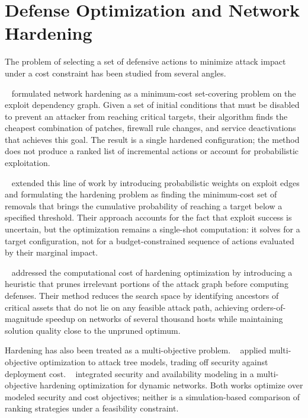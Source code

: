 \section{Defense Optimization and Network Hardening}

The problem of selecting a set of defensive actions to minimize attack impact under a cost constraint has been studied from several angles.

\citeauthor{noel03}~\cite{noel03} formulated network hardening as a minimum-cost set-covering problem on the exploit dependency graph. Given a set of initial conditions that must be disabled to prevent an attacker from reaching critical targets, their algorithm finds the cheapest combination of patches, firewall rule changes, and service deactivations that achieves this goal. The result is a single hardened configuration; the method does not produce a ranked list of incremental actions or account for probabilistic exploitation.

\citeauthor{wang06hardening}~\cite{wang06hardening} extended this line of work by introducing probabilistic weights on exploit edges and formulating the hardening problem as finding the minimum-cost set of removals that brings the cumulative probability of reaching a target below a specified threshold. Their approach accounts for the fact that exploit success is uncertain, but the optimization remains a single-shot computation: it solves for a target configuration, not for a budget-constrained sequence of actions evaluated by their marginal impact.

\citeauthor{albanese12}~\cite{albanese12} addressed the computational cost of hardening optimization by introducing a heuristic that prunes irrelevant portions of the attack graph before computing defenses. Their method reduces the search space by identifying ancestors of critical assets that do not lie on any feasible attack path, achieving orders-of-magnitude speedup on networks of several thousand hosts while maintaining solution quality close to the unpruned optimum.

Hardening has also been treated as a multi-objective problem. \citeauthor{dewri07}~\cite{dewri07} applied multi-objective optimization to attack tree models, trading off security against deployment cost. \citeauthor{enoch22}~\cite{enoch22} integrated security and availability modeling in a multi-objective hardening optimization for dynamic networks. Both works optimize over modeled security and cost objectives; neither is a simulation-based comparison of ranking strategies under a feasibility constraint.

